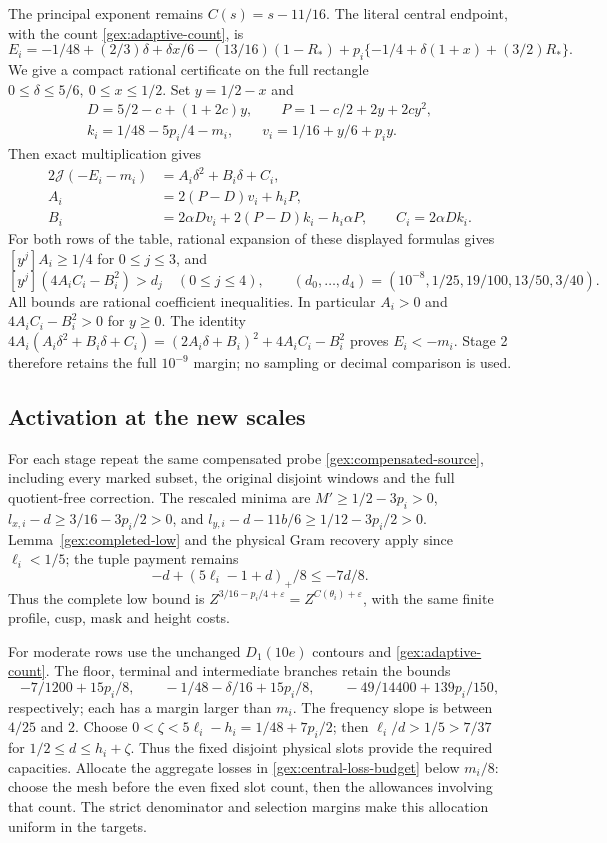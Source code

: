 The principal exponent remains \(C(s)=s-11/16\). The literal central
endpoint, with the count \eqref{gex:adaptive-count}, is
\[
 E_i=-1/48+(2/3)\delta+\delta x/6-(13/16)(1-R_*)
       +p_i\{-1/4+\delta(1+x)+(3/2)R_*\}.
\]
We give a compact rational certificate on the full rectangle
\(0\le\delta\le5/6,\ 0\le x\le1/2\). Set \(y=1/2-x\) and
\[
\begin{gathered}
 D=5/2-c+(1+2c)y,\qquad P=1-c/2+2y+2cy^2,\\
 k_i=1/48-5p_i/4-m_i,\qquad v_i=1/16+y/6+p_i y.
\end{gathered}
\]
Then exact multiplication gives
\begin{equation}\label{gex:adaptive-certificate}
\begin{aligned}
 2\mathcal J(-E_i-m_i)&=A_i\delta^2+B_i\delta+C_i,\\
 A_i&=2(P-D)v_i+h_iP,\\
 B_i&=2\alpha Dv_i+2(P-D)k_i-h_i\alpha P,\qquad
 C_i=2\alpha Dk_i.
\end{aligned}
\end{equation}
For both rows of the table, rational expansion of these displayed
formulas gives \([y^j]A_i\ge1/4\) for \(0\le j\le3\), and
\[
 [y^j](4A_iC_i-B_i^2)>d_j\quad(0\le j\le4),\qquad
 (d_0,\ldots,d_4)=
 (10^{-8},1/25,19/100,13/50,3/40).
\]
All bounds are rational coefficient inequalities. In particular
\(A_i>0\) and \(4A_iC_i-B_i^2>0\) for \(y\ge0\). The identity
\(4A_i(A_i\delta^2+B_i\delta+C_i)
 =(2A_i\delta+B_i)^2+4A_iC_i-B_i^2\)
proves \(E_i<-m_i\). Stage 2 therefore retains the full
\(10^{-9}\) margin; no sampling or decimal comparison is used.

\subsection{Activation at the new scales}

For each stage repeat the same compensated probe
\eqref{gex:compensated-source}, including every marked subset, the
original disjoint windows and the full quotient-free correction.
The rescaled minima are
\(M'\ge1/2-3p_i>0\), \(l_{x,i}-d\ge3/16-3p_i/2>0\), and
\(l_{y,i}-d-11b/6\ge1/12-3p_i/2>0\).
Lemma~\ref{gex:completed-low}
and the physical Gram recovery apply since \(\ell_i<1/5\);
the tuple payment remains
\[
 -d+(5\ell_i-1+d)_+/8\le-7d/8.
\]
Thus the complete low bound is
\(Z^{3/16-p_i/4+\varepsilon}=Z^{C(\theta_i)+\varepsilon}\),
with the same finite profile, cusp, mask and height costs.

For moderate rows use the unchanged \(D_1(10e)\) contours and
\eqref{gex:adaptive-count}. The floor, terminal and intermediate
branches retain the bounds
\[
 -7/1200+15p_i/8,\qquad
 -1/48-\delta/16+15p_i/8,\qquad
 -49/14400+139p_i/150,
\]
respectively; each has a margin larger than \(m_i\).
The frequency slope is between \(4/25\) and \(2\).
Choose \(0<\zeta<5\ell_i-h_i=1/48+7p_i/2\); then
\(\ell_i/d>1/5>7/37\) for \(1/2\le d\le h_i+\zeta\).
Thus the fixed disjoint physical slots provide the required capacities.
Allocate the aggregate losses in \eqref{gex:central-loss-budget}
below \(m_i/8\): choose the mesh before the even fixed slot count,
then the allowances involving that count. The strict denominator and
selection margins make this allocation uniform in the targets.


